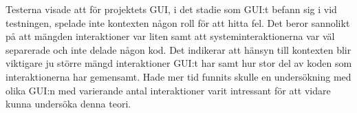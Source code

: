 Testerna visade att för projektets GUI, i det stadie som GUI:t befann sig i vid testningen, spelade inte kontexten någon roll för att hitta fel. Det beror sannolikt på att mängden interaktioner var liten samt att systeminteraktionerna var väl separerade och inte delade någon kod. Det indikerar att hänsyn till kontexten blir viktigare ju större mängd interaktioner GUI:t har samt hur stor del av koden som interaktionerna har gemensamt. Hade mer tid funnits skulle en undersökning med olika GUI:n med varierande antal interaktioner varit intressant för att vidare kunna undersöka denna teori.

